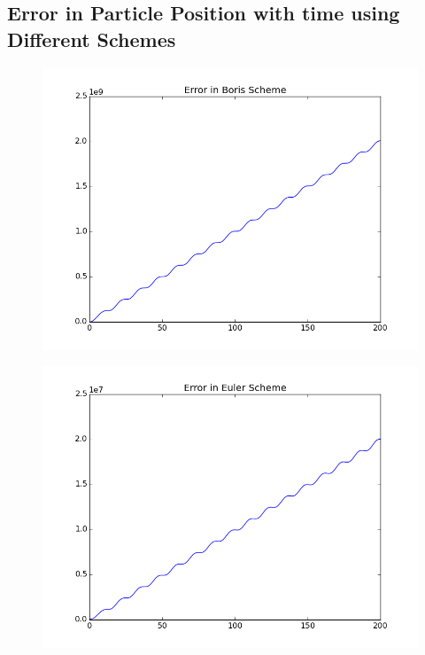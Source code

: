 \documentclass[11pt, a4paper]{article}
\begin{document}
\subsection{Error in Particle Position with time using Different Schemes}
\begin{figure}[H]
 \centering
 \includegraphics[width = \textwidth]{q3_error_boris.png}
\end{figure}
\begin{figure}[H]
 \centering
 \includegraphics[width = \textwidth]{q3_error_euler.png}
\end{figure}
\end{document}
